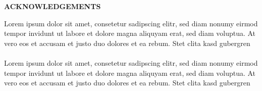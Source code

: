 \begin{center}  \Large{\textbf{ACKNOWLEDGEMENTS}}  \end{center}
\vspace{3pt}
Lorem ipsum dolor sit amet, consetetur sadipscing elitr, sed diam nonumy eirmod tempor invidunt ut labore et dolore magna aliquyam erat, sed diam voluptua. At vero eos et accusam et justo duo dolores et ea rebum. Stet clita kasd gubergren \\\\
Lorem ipsum dolor sit amet, consetetur sadipscing elitr, sed diam nonumy eirmod tempor invidunt ut labore et dolore magna aliquyam erat, sed diam voluptua. At vero eos et accusam et justo duo dolores et ea rebum. Stet clita kasd gubergren\\